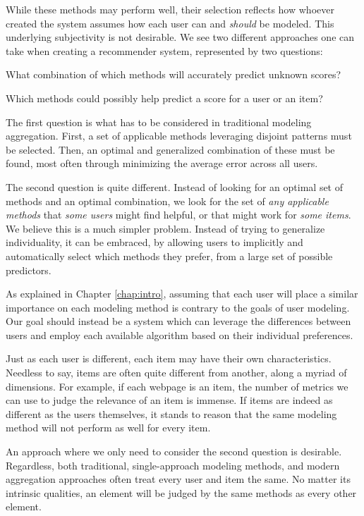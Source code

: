 While these methods may perform well, their selection
reflects how whoever created the system assumes how each user
can and \emph{should} be modeled. This underlying subjectivity is not desirable.
We see two different approaches one can take when creating a recommender system,
represented by two questions:

\clearpage

\begin{enumerate*}
  \item What combination of which methods will accurately predict unknown scores?
  \item Which methods could possibly help predict a score for a user or an item?
\end{enumerate*}

The first question is what has to be considered in traditional modeling aggregation.
First, a set of applicable methods leveraging disjoint patterns must be selected. 
Then, an optimal and generalized combination of these must be found,
most often through minimizing the average error across all users.

The second question is quite different. 
Instead of looking for an optimal set of methods and an optimal combination,
we look for the set of \emph{any applicable methods} that \emph{some users} might find helpful,
or that might work for \emph{some items}.
We believe this is a much simpler problem. 
Instead of trying to generalize individuality,
it can be embraced, by allowing users to implicitly and automatically select which methods they prefer,
from a large set of possible predictors.

As explained in Chapter \ref{chap:intro}, 
assuming that each user will place a similar importance on each modeling method is 
contrary to the goals of user modeling. 
Our goal should instead be a system which can leverage the differences
between users and employ each available algorithm based on their individual preferences.

Just as each user is different, each item may have their own characteristics.
Needless to say, items are often quite different from another,
along a myriad of dimensions. For example,
if each webpage is an item, the number of metrics we can use to judge
the relevance of an item is immense.
If items are indeed as different as the users themselves, it stands to reason that the same 
modeling method will not perform as well for every item.

An approach where we only need to consider the second question is desirable.
Regardless, both traditional, single-approach modeling methods, and modern aggregation approaches
often treat every user and item the same. No matter its intrinsic qualities, an element will be judged
by the same methods as every other element. 

